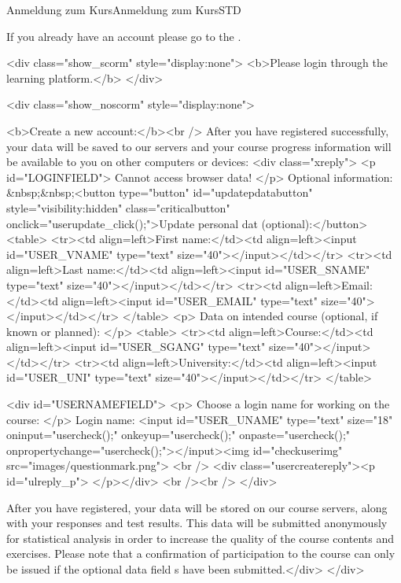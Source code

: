 \begin{MXContent}{Anmeldung zum Kurs}{Anmeldung zum Kurs}{STD}
\MGlobalConfTag
{}

If you already have an account please go to the .

\begin{html}
<div class="show_scorm" style="display:none">
<b>Please login through the learning platform.</b>
</div>
\end{html}

\begin{html}
<div class="show_noscorm" style="display:none">

<b>Create a new account:</b><br />
After you have registered successfully, your data will be saved to our servers
and your course progress information will be available to you on other
computers or devices:
<div class="xreply">
<p id="LOGINFIELD">
Cannot access browser data!
</p>
Optional information: &nbsp;&nbsp;<button type="button" id="updatepdatabutton"
style="visibility:hidden" class="criticalbutton"
onclick="userupdate_click();">Update personal dat (optional):</button> 
<table>
  <tr><td align=left>First name:</td><td align=left><input id="USER_VNAME" type="text" size="40"></input></td></tr>
  <tr><td align=left>Last name:</td><td align=left><input id="USER_SNAME" type="text" size="40"></input></td></tr>
  <tr><td align=left>Email:</td><td align=left><input id="USER_EMAIL" type="text" size="40"></input></td></tr>
</table>
<p>
Data on intended course (optional, if known or planned):
</p>
<table>
  <tr><td align=left>Course:</td><td align=left><input id="USER_SGANG"
  type="text" size="40"></input></td></tr> <tr><td align=left>University:</td><td align=left><input id="USER_UNI" type="text" size="40"></input></td></tr>
</table>

<div id="USERNAMEFIELD">
<p>
Choose a login name for working on the course:
</p>
Login name: <input id="USER_UNAME" type="text" size="18" oninput="usercheck();" onkeyup="usercheck();" onpaste="usercheck();" onpropertychange="usercheck();"></input><img id="checkuserimg" src="images/questionmark.png">
<br />
<div class="usercreatereply"><p id="ulreply_p"> </p></div>
<br /><br />
</div>

After you have registered, your data will be stored on our course servers, along
with your responses and test results. This data will be submitted anonymously
for statistical analysis in order to increase the quality of the course contents
and exercises. Please note that a confirmation of participation to the course
can only be issued if the optional data field s have been submitted.</div>
</div>
\end{html}


\end{MXContent}

